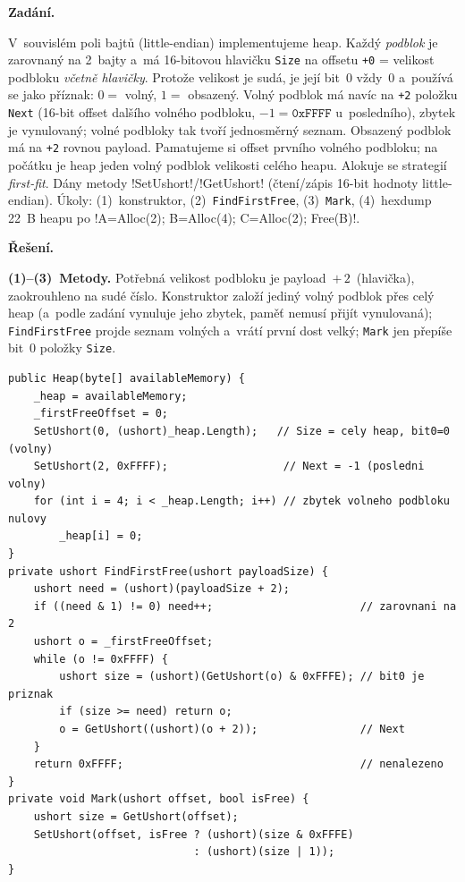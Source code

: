 \begin{priklad}
\par
\textbf{Zadání.}\par
V~souvislém poli bajtů (little-endian) implementujeme heap. Každý \emph{podblok} je zarovnaný na 2~bajty a~má 16-bitovou hlavičku \texttt{Size} na offsetu \texttt{+0} = velikost podbloku \emph{včetně hlavičky}. Protože velikost je sudá, je její bit~0 vždy~0 a~používá se jako příznak: $0=$ volný, $1=$ obsazený. Volný podblok má navíc na \texttt{+2} položku \texttt{Next} (16-bit offset dalšího volného podbloku, $-1=\texttt{0xFFFF}$ u~posledního), zbytek je vynulovaný; volné podbloky tak tvoří jednosměrný seznam. Obsazený podblok má na \texttt{+2} rovnou payload. Pamatujeme si offset prvního volného podbloku; na počátku je heap jeden volný podblok velikosti celého heapu. Alokuje se strategií \emph{first-fit}. Dány metody \cd!SetUshort!/\cd!GetUshort! (čtení/zápis 16-bit hodnoty little-endian). Úkoly: (1)~konstruktor, (2)~\texttt{FindFirstFree}, (3)~\texttt{Mark}, (4)~hexdump 22~B heapu po \cd!A=Alloc(2); B=Alloc(4); C=Alloc(2); Free(B)!.

\medskip
\textbf{Řešení.}\par
\textbf{(1)--(3)~Metody.} Potřebná velikost podbloku je payload~$+\,2$~(hlavička), zaokrouhleno na sudé číslo. Konstruktor založí jediný volný podblok přes celý heap (a~podle zadání vynuluje jeho zbytek, paměť nemusí přijít vynulovaná); \texttt{FindFirstFree} projde seznam volných a~vrátí první dost velký; \texttt{Mark} jen přepíše bit~0 položky \texttt{Size}.
\begin{lstlisting}[language={[Sharp]C}]
public Heap(byte[] availableMemory) {
    _heap = availableMemory;
    _firstFreeOffset = 0;
    SetUshort(0, (ushort)_heap.Length);   // Size = cely heap, bit0=0 (volny)
    SetUshort(2, 0xFFFF);                  // Next = -1 (posledni volny)
    for (int i = 4; i < _heap.Length; i++) // zbytek volneho podbloku nulovy
        _heap[i] = 0;
}
private ushort FindFirstFree(ushort payloadSize) {
    ushort need = (ushort)(payloadSize + 2);
    if ((need & 1) != 0) need++;                       // zarovnani na 2
    ushort o = _firstFreeOffset;
    while (o != 0xFFFF) {
        ushort size = (ushort)(GetUshort(o) & 0xFFFE); // bit0 je priznak
        if (size >= need) return o;
        o = GetUshort((ushort)(o + 2));                // Next
    }
    return 0xFFFF;                                     // nenalezeno
}
private void Mark(ushort offset, bool isFree) {
    ushort size = GetUshort(offset);
    SetUshort(offset, isFree ? (ushort)(size & 0xFFFE)
                             : (ushort)(size | 1));
}
\end{lstlisting}


\end{priklad}
